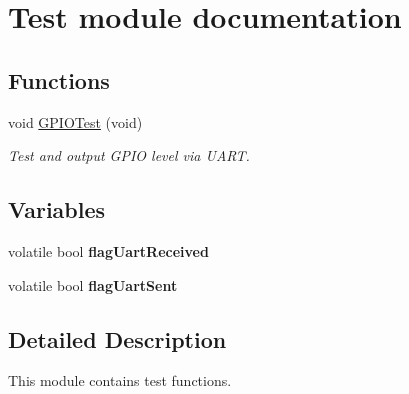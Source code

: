 \hypertarget{group___test__module}{\section{Test module documentation}
\label{group___test__module}
}
\subsection*{Functions}
\begin{DoxyCompactItemize}
\item 
\hypertarget{group___test__module_ga10be9799ca64a9b3ae03649475312e2f}{void \hyperlink{group___test__module_ga10be9799ca64a9b3ae03649475312e2f}{G\-P\-I\-O\-Test} (void)}\label{group___test__module_ga10be9799ca64a9b3ae03649475312e2f}

\begin{DoxyCompactList}\small\item\em Test and output G\-P\-I\-O level via U\-A\-R\-T. \end{DoxyCompactList}\end{DoxyCompactItemize}
\subsection*{Variables}
\begin{DoxyCompactItemize}
\item 
\hypertarget{group___test__module_gacb4b582697b692bea18183e4d765e873}{volatile bool {\bfseries flag\-Uart\-Received}}\label{group___test__module_gacb4b582697b692bea18183e4d765e873}

\item 
\hypertarget{group___test__module_ga9f15f76f8a25850e988e1ea43a80f03a}{volatile bool {\bfseries flag\-Uart\-Sent}}\label{group___test__module_ga9f15f76f8a25850e988e1ea43a80f03a}

\end{DoxyCompactItemize}


\subsection{Detailed Description}
This module contains test functions. 